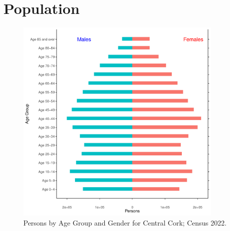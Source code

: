 \documentclass{article}
\begin{document}
\pagebreak

\section{Population} 
\label{sect:Pop}

\begin{figure}[h]
	\centering
	\includegraphics[width = 100mm]{../figures/PyramidPlot.pdf}
	\caption{Persons by Age Group and Gender for Central Cork; Census 2022.}
	\label{fig:2ae19629-1a6a-13a3-e055-000000000001}
	\end{figure}
\end{document}
